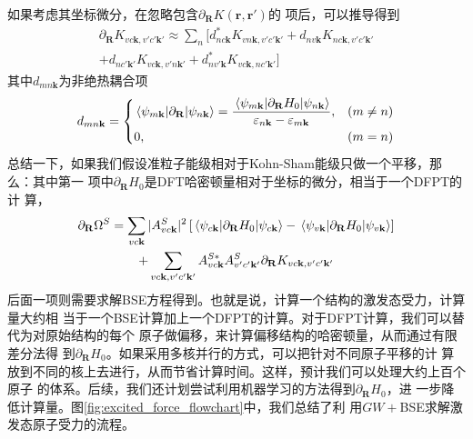  如果考虑其坐标微分，在忽略包含$\partial_\mathbf{R}K(\mathbf{r},\mathbf{r'})$的
  项后，可以推导得到
  \begin{multline}
    \partial_\mathbf{R}K_{vc\mathbf{k},v'c'\mathbf{k}'}  
    \approx
    \sum_n \biggl[
      d^*_{nc\mathbf{k}}K_{vn\mathbf{k},v'c'\mathbf{k}'}  
      +
      d_{nv\mathbf{k}}K_{nc\mathbf{k},v'c'\mathbf{k}'}  
      \\
      +
      d_{nc'\mathbf{k}'}K_{vc\mathbf{k},v'n\mathbf{k}'}  
      +
      d^*_{nv'\mathbf{k}}K_{vc\mathbf{k},nc'\mathbf{k}'}  
    \biggr]
  \end{multline}
  其中$d_{mn\mathbf{k}}$为非绝热耦合项
  \begin{equation}
    d_{mn\mathbf{k}}
    =
    \begin{cases}
      \mel{\psi_{m\mathbf{k}}}{\partial_\mathbf{R}}{\psi_{n\mathbf{k}}}
      =
      \dfrac{
        \mel{\psi_{m\mathbf{k}}}{\partial_\mathbf{R} H_0}{\psi_{n\mathbf{k}}}
      }{
        \varepsilon_{n\mathbf{k}} - \varepsilon_{m\mathbf{k}}
      }, & (m\ne n)
      \\[6pt]
      0, & (m=n)
    \end{cases}
  \end{equation}
  总结一下，如果我们假设准粒子能级相对于Kohn-Sham能级只做一个平移，那么：其中第一
  项中$\partial_\mathbf{R}H_0$是DFT哈密顿量相对于坐标的微分，相当于一个DFPT的计
  算，
  \begin{multline}
    \partial_\mathbf{R} \Omega^S
    =
    \sum_{vc\mathbf{k}}
    |A^S_{vc\mathbf{k}}|^2 \left[
      \mel{\psi_{c\mathbf{k}}}{\partial_\mathbf{R} H_0}{\psi_{c\mathbf{k}}}
      -
      \mel{\psi_{v\mathbf{k}}}{\partial_\mathbf{R} H_0}{\psi_{v\mathbf{k}}}
    \right]
    \\
    +
    \sum_{vc\mathbf{k}, v'c'\mathbf{k}'}
    A^{S*}_{vc\mathbf{k}}
    A^{S}_{v'c'\mathbf{k}'}
    \partial_\mathbf{R} K_{vc\mathbf{k}, v'c'\mathbf{k}'}
  \end{multline}
  后面一项则需要求解BSE方程得到。也就是说，计算一个结构的激发态受力，计算量大约相
  当于一个BSE计算加上一个DFPT的计算。对于DFPT计算，我们可以替代为对原始结构的每个
  原子做偏移，来计算偏移结构的哈密顿量，从而通过有限差分法得
  到$\partial_\mathbf{R}H_0$。如果采用多核并行的方式，可以把针对不同原子平移的计
  算放到不同的核上去进行，从而节省计算时间。这样，预计我们可以处理大约上百个原子
  的体系。后续，我们还计划尝试利用机器学习的方法得到$\partial_\mathbf{R} H_0$，进
  一步降低计算量。图\ref{fig:excited_force_flowchart}中，我们总结了利
  用$GW+{}$BSE求解激发态原子受力的流程。

